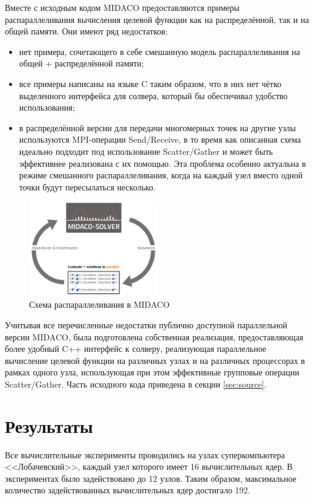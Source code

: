 \documentclass[a4paper]{article}
\begin{document}
Вместе с исходным кодом MIDACO предоставляются примеры распараллеливания вычисления целевой функции как на распределённой,
так и на общей памяти. Они имеют ряд недостатков:
\begin{itemize}
  \item нет примера, сочетающего в себе смешанную модель распараллеливания на
  общей + распределённой памяти;
  \item все примеры написаны на языке C таким образом, что в них нет чётко выделенного интерфейса для солвера,
  который бы обеспечивал удобство использования;
  \item в распределённой версии для передачи многомерных точек на другие узлы используются
  MPI-операции Send/Receive, в то время как описанная схема идеально подходит под использование
  Scatter/Gather и может быть эффективнее реализована с их помощью. Эта проблема особенно актуальна в режиме смешанного
  распараллеливания, когда на каждый узел вместо одной точки будут пересылаться несколько.
\end{itemize}

\begin{figure}[H]
  \center
  \includegraphics[width=0.5\textwidth]{parallel_loop.png}
  \caption{Схема распараллеливания в MIDACO}
  \label{fig:midaco}
\end{figure}

Учитывая все перечисленные недостатки публично доступной параллельной версии MIDACO, была
подготовлена собственная реализация, предоставляющая более удобный C++ интерфейс к солверу,
реализующая параллельное вычисление целевой функции на различных узлах и на различных процессорах в
рамках одного узла, использующая при этом эффективные групповые операции Scatter/Gather.
Часть исходного кода приведена в секции \ref{sec:source}.

\section{Результаты}

Все вычислительные эксперименты проводились на узлах суперкомпьютера <<Лобачевский>>, каждый узел которого
имеет 16 вычислительных ядер. В экспериментах было задействовано до 12 узлов. Таким образом, максимальное
количество задействованных вычислительных ядер достигало 192.
\end{document}
